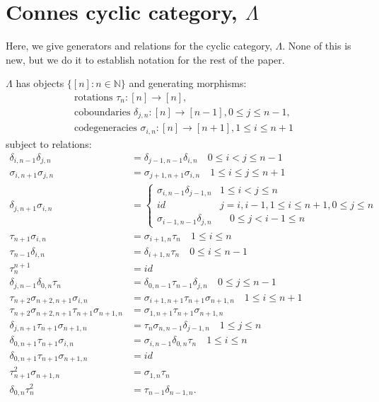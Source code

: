 \chapter{Connes cyclic category, $\Lambda$}\label{chap:lambda}
Here, we give generators and relations for 
the cyclic category, $\Lambda$. None of this 
is new, but we do it to establish notation 
for the rest of the paper.

$\Lambda$ has objects $\{[n]: n \in \mathbb{N}\}$ 
and generating morphisms:
\begin{equation} \label{eqn:cyclic_generators}
\begin{split}
\textrm{rotations } \tau_n:[n] \to [n], \\ 
\textrm{coboundaries } \delta_{j,n}: [n] \to [n-1], 0 \leq j \leq n-1, \\ 
\textrm{codegeneracies } \sigma_{i,n}:[n] \to [n+1], 1 \leq i \leq n+1
\end{split}
\end{equation}
subject to relations:
\begin{equation}\label{eqn:cyclic_relations}
\begin{split}
\delta_{i,n-1} \delta_{j,n} &= \delta_{j-1,n-1} \delta_{i,n} 
  \quad 0 \leq i < j \leq n-1 \\
\sigma_{i,n+1} \sigma_{j,n} &= \sigma_{j+1,n+1} \sigma_{i,n}
  \quad 1 \leq i \leq j \leq n+1 \\
\delta_{j,n+1}\sigma_{i,n} &= 
  \begin{cases}
    \sigma_{i,n-1}\delta_{j-1,n} 
      & 1 \leq i < j \leq n\\
    id & j = i, i-1, 
      1 \leq i \leq n+1, 0 \leq j \leq n\\
    \sigma_{i-1,n-1}\delta_{j,n} 
      & \quad 0 \leq j < i-1 \leq n
   \end{cases}\\
\tau_{n+1}\sigma_{i,n} &= \sigma_{i+1,n}\tau_n
  \quad 1 \leq i \leq n\\   
\tau_{n-1}\delta_{i,n} &= \delta_{i+1,n}\tau_n
  \quad 0 \leq i \leq n-1\\  
\tau_{n}^{n+1} &= id \\
\delta_{j,n-1} \delta_{0,n} \tau_n &=
  \delta_{0,n-1} \tau_{n-1} \delta_{j,n}
  \quad 0 \leq j \leq n-1\\
\tau_{n+2} \sigma_{n+2,n+1} \sigma_{i,n} &=
  \sigma_{i+1,n+1} \tau_{n+1} \sigma_{n+1,n}
  \quad 1 \leq i \leq n+1\\
\tau_{n+2} \sigma_{n+2,n+1} \tau_{n+1} \sigma_{n+1,n} &=
  \sigma_{1,n+1} \tau_{n+1} \sigma_{n+1,n}\\  
\delta_{j,n+1}\tau_{n+1}\sigma_{n+1,n}
  &= \tau_n \sigma_{n,n-1} \delta_{j-1,n} 
  \quad 1 \leq j \leq n\\
\delta_{0,n+1}\tau_{n+1}\sigma_{i,n}
  &= \sigma_{i,n-1}\delta_{0,n}\tau_n
  \quad 1 \leq i \leq n\\
\delta_{0,n+1}\tau_{n+1}\sigma_{n+1,n} &= id\\
\tau_{n+1}^2 \sigma_{n+1,n} &= \sigma_{1,n} \tau_n \\
\delta_{0,n}\tau_n^2 &= \tau_{n-1}\delta_{n-1,n}. 
\end{split}
\end{equation}


